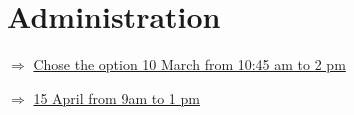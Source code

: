 \chapter{Administration}


$\Rightarrow$ \href{https://employeecourses.dtu.dk/en/hr/administrative-staff/dtu-culture-day/}{Chose the option 10 March from 10:45 am to 2 pm}


$\Rightarrow$ \href{https://employeecourses.dtu.dk/en/hr/administrative-staff/introduction-to-responsible-conduct-of-research-and-research-data-management-for-new-employees/}{15 April from 9am to 1 pm}


